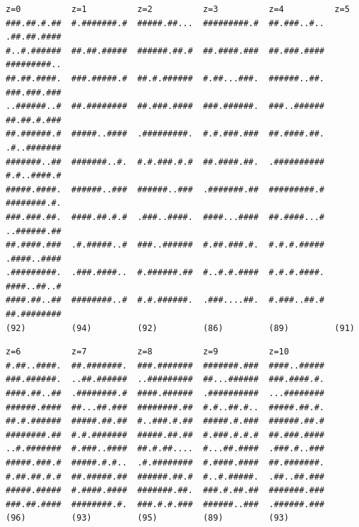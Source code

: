 \begin{verbatim}
z=0          z=1          z=2          z=3          z=4          z=5        
###.##.#.##  #.#######.#  #####.##...  #########.#  ##.###..#..  .##.##.####
#..#.######  ##.##.#####  ######.##.#  ##.####.###  ##.###.####  #########..
##.##.####.  ###.#####.#  ##.#.######  #.##...###.  ######..##.  ###.###.###
..######..#  ##.########  ##.###.####  ###.######.  ###..######  ##.##.#.###
##.######.#  #####..####  .#########.  #.#.###.###  ##.####.##.  .#..#######
#######..##  #######..#.  #.#.###.#.#  ##.####.##.  .##########  #.#..####.#
#####.####.  ######..###  ######..###  .#######.##  #########.#  ########.#.
###.###.##.  ####.##.#.#  .###..####.  ####...####  ##.####...#  ..######.##
##.####.###  .#.#####..#  ###..######  #.##.###.#.  #.#.#.#####  .####..####
.#########.  .###.####..  #.######.##  #..#.#.####  #.#.#.####.  ####..##..#
####.##..##  ########..#  #.#.######.  .###....##.  #.###..##.#  ##.########
(92)         (94)         (92)         (86)         (89)         (91)       
\end{verbatim}
\begin{verbatim}
z=6          z=7          z=8          z=9          z=10       
#.##..####.  ##.#######.  ###.#######  #######.###  ####..#####
###.######.  ..##.######  ..#########  ##...######  ###.####.#.
####.##..##  .########.#  ####.######  .##########  ...########
######.####  ##...##.###  ########.##  #.#..##.#..  #####.##.#.
##.#.######  #####.##.##  #..###.#.##  #####.#.###  ######.##.#
########.##  #.#.#######  #####.##.##  #.###.#.#.#  ##.###.####
..#.#######  #.###..####  ##.#.##....  #...##.####  .###.#..###
#####.###.#  #####.#.#..  .#.########  #.####.####  ##.#######.
#.##.##.#.#  ##.#####.##  ######.##.#  #..#.#####.  .##..##.###
#####.#####  #.####.####  #######.##.  ###.#.##.##  #######.###
###.##.####  ########.#.  ###.#.#.###  ######..###  .######.###
(96)         (93)         (95)         (89)         (93)       
\end{verbatim}